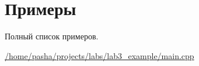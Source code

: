 \section{Примеры}
Полный список примеров.\begin{DoxyCompactItemize}
\item 
\hyperlink{_2home_2pasha_2projects_2labs_2lab3_example_2main_8cpp-example}{/home/pasha/projects/labs/lab3\+\_\+example/main.\+cpp}
\end{DoxyCompactItemize}
